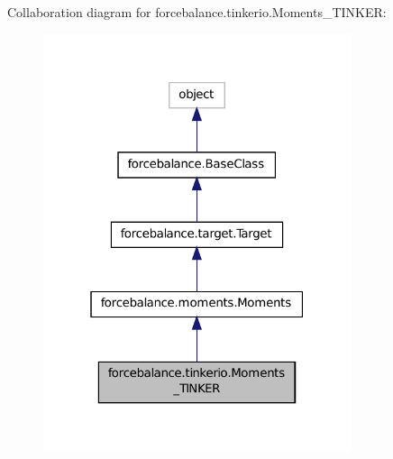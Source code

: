 Collaboration diagram for forcebalance.\-tinkerio.\-Moments\-\_\-\-T\-I\-N\-K\-E\-R\-:
\nopagebreak
\begin{figure}[H]
\begin{center}
\leavevmode
\includegraphics[width=256pt]{classforcebalance_1_1tinkerio_1_1Moments__TINKER__coll__graph}
\end{center}
\end{figure}
